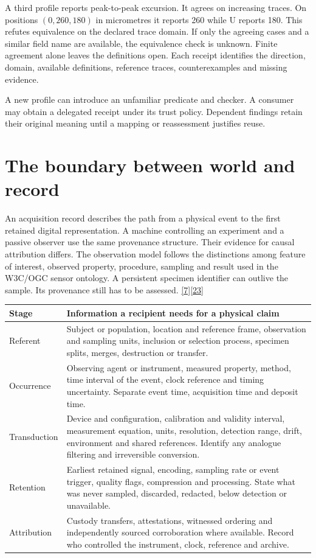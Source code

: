 \documentclass[11pt,a4paper]{article}
\newcommand{\partpage}[1]{\clearpage\section{#1}}
\newcommand{\src}[1]{\hyperlink{ref#1}{[#1]}}
\begin{document}
A third profile reports peak-to-peak excursion. It agrees on increasing traces. On positions $(0,260,180)$ in micrometres it reports 260 while U reports 180. This refutes equivalence on the declared trace domain. If only the agreeing cases and a similar field name are available, the equivalence check is unknown. Finite agreement alone leaves the definitions open. Each receipt identifies the direction, domain, available definitions, reference traces, counterexamples and missing evidence.

A new profile can introduce an unfamiliar predicate and checker. A consumer may obtain a delegated receipt under its trust policy. Dependent findings retain their original meaning until a mapping or reassessment justifies reuse.

\partpage{The boundary between world and record}
An acquisition record describes the path from a physical event to the first retained digital representation. A machine controlling an experiment and a passive observer use the same provenance structure. Their evidence for causal attribution differs. The observation model follows the distinctions among feature of interest, observed property, procedure, sampling and result used in the W3C/OGC sensor ontology. A persistent specimen identifier can outlive the sample. Its provenance still has to be assessed. \src{7}\src{23}

\small
\begin{tabularx}{\linewidth}{@{}L{.21\linewidth}Y@{}}
\toprule
\textbf{Stage} & \textbf{Information a recipient needs for a physical claim} \\ \midrule
Referent & Subject or population, location and reference frame, observation and sampling units, inclusion or selection process, specimen splits, merges, destruction or transfer. \\
Occurrence & Observing agent or instrument, measured property, method, time interval of the event, clock reference and timing uncertainty. Separate event time, acquisition time and deposit time. \\
Transduction & Device and configuration, calibration and validity interval, measurement equation, units, resolution, detection range, drift, environment and shared references. Identify any analogue filtering and irreversible conversion. \\
Retention & Earliest retained signal, encoding, sampling rate or event trigger, quality flags, compression and processing. State what was never sampled, discarded, redacted, below detection or unavailable. \\
Attribution & Custody transfers, attestations, witnessed ordering and independently sourced corroboration where available. Record who controlled the instrument, clock, reference and archive. \\
\bottomrule
\end{tabularx}
\normalsize
\end{document}
